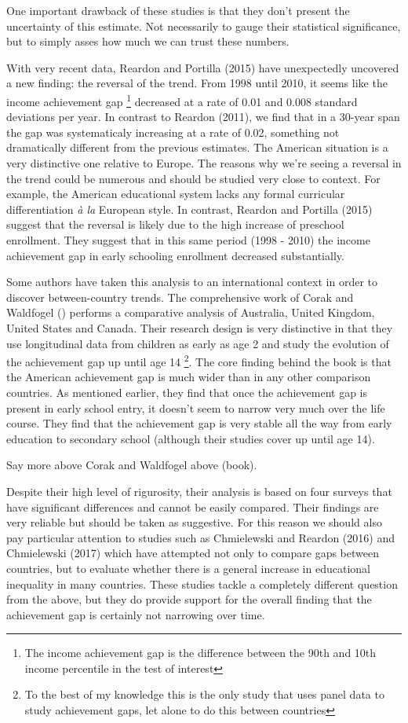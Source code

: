 \documentclass[11pt, a4paper]{article}\usepackage[]{graphicx}\usepackage[]{color}
\begin{document}
One important drawback of these studies is that they don't present the uncertainty of this estimate. Not necessarily to gauge their statistical significance, but to simply asses how much we can trust these numbers.

With very recent data, Reardon and Portilla (2015) have unexpectedly uncovered a new finding: the reversal of the trend. From 1998 until 2010, it seems like the income achievement gap \footnote{The income achievement gap is the difference between the 90th and 10th income percentile in the test of interest} decreased at a rate of 0.01 and 0.008 standard deviations per year. In contrast to Reardon (2011), we find that in a 30-year span the gap was systematicaly increasing at a rate of 0.02, something not dramatically different from the previous estimates. The American situation is a very distinctive one relative to Europe. The reasons why we're seeing a reversal in the trend could be numerous and should be studied very close to context. For example, the American educational system lacks any formal curricular differentiation \emph{à la} European style. In contrast, Reardon and Portilla (2015) suggest that the reversal is likely due to the high increase of preschool enrollment. They suggest that in this same period (1998 - 2010) the income achievement gap in early schooling enrollment decreased substantially.

Some authors have taken this analysis to an international context in order to discover between-country trends. The comprehensive work of Corak and Waldfogel () performs a comparative analysis of Australia, United Kingdom, United States and Canada. Their research design is very distinctive in that they use longitudinal data from children as early as age 2 and study the evolution of the achievement gap up until age 14 \footnote{To the best of my knowledge this is the only study that uses panel data to study achievement gaps, let alone to do this between countries}. The core finding behind the book is that the American achievement gap is much wider than in any other comparison countries. As mentioned earlier, they find that once the achievement gap is present in early school entry, it doesn't seem to narrow very much over the life course. They find that the achievement gap is very stable all the way from early education to secondary school (although their studies cover up until age 14). 

Say more above Corak and Waldfogel above (book).

Despite their high level of rigurosity, their analysis is based on four surveys that have significant differences and cannot be easily compared. Their findings are very reliable but should be taken as suggestive.  For this reason we should also pay particular attention to studies such as Chmielewski and Reardon (2016) and Chmielewski (2017) which have attempted not only to compare gaps between countries, but to evaluate whether there is a general increase in educational inequality in many countries. These studies tackle a completely different question from the above, but they do provide support for the overall finding that the achievement gap is certainly not narrowing over time.
\end{document}
